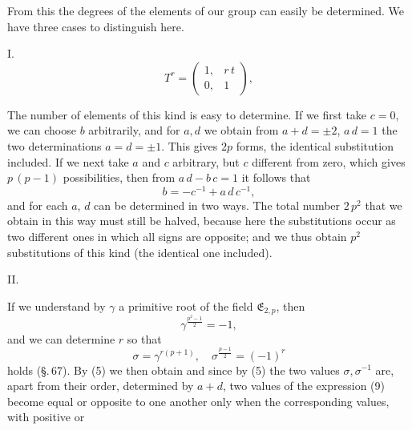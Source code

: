 From this the degrees of the elements of our group can easily be
determined. We have three cases to distinguish here.

I.~ 
\[
T^r = \begin{pmatrix} 1, & r\,t \\ 0, & 1 \end{pmatrix},
\]

The number of elements of this kind is easy to determine.
If we first take $c = 0$, we can choose $b$ arbitrarily,
and for $a, d$ we obtain from $a + d = \pm 2$, $a\,d = 1$ the two
determinations $a = d = \pm 1$. This gives $2p$ forms, the identical
substitution included. If we next take $a$ and $c$
arbitrary, but $c$ different from zero, which gives $p\,(p-1)$ possibilities,
then from $a\,d - b\,c = 1$ it follows that
\[
b = -c^{-1} + a\,d\,c^{-1},
\]
and for each $a$, $d$ can be determined in two ways. The
total number $2\,p^2$ that we obtain in this way must still be halved, because
here the substitutions occur as two different ones in which
all signs are opposite; and we thus obtain $p^2$ substitutions
of this kind (the identical one included).

II.~

If we understand by $\gamma$ a primitive root of the field
$\mathfrak{E}_{2,p}$, then
\[
\gamma^{\frac{p^2-1}{2}} = -1,
\]
and we can determine $r$ so that
\[
\sigma = \gamma^{r(p+1)}, \quad \sigma^{\frac{p-1}{2}} = (-1)^r
\]
holds (\S.\,67). By (5) we then obtain
and since by (5) the two values $\sigma, \sigma^{-1}$ are, apart from
their order, determined by $a+d$, two values
of the expression (9) become equal or opposite to one another
only when the corresponding values, with positive or
